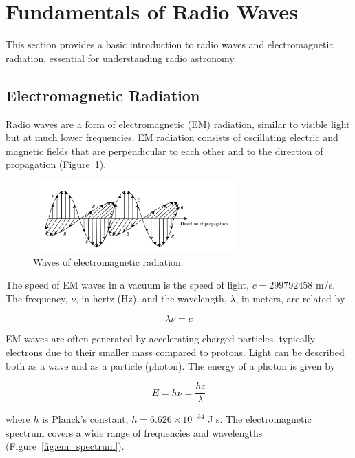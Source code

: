 \clearpage

\section{Fundamentals of Radio Waves}

This section provides a basic introduction to radio waves and electromagnetic radiation, essential for understanding radio astronomy.

\subsection{Electromagnetic Radiation}

Radio waves are a form of electromagnetic (EM) radiation, similar to visible light but at much lower frequencies. EM radiation consists of oscillating electric and magnetic fields that are perpendicular to each other and to the direction of propagation (Figure~\ref{fig:em_waves}).

\begin{figure}[H]
    \centering
    \includegraphics[width=0.7\textwidth]{Images/em_waves.png}
    \caption{Waves of electromagnetic radiation.}
    \label{fig:em_waves}
\end{figure}

The speed of EM waves in a vacuum is the speed of light, $c = 299 792 458$ m/s. The frequency, $\nu$, in hertz (Hz), and the wavelength, $\lambda$, in meters, are related by

\begin{equation}
    \lambda \nu = c
\end{equation}

EM waves are often generated by accelerating charged particles, typically electrons due to their smaller mass compared to protons. Light can be described both as a wave and as a particle (photon). The energy of a photon is given by

\begin{equation}
    E = h\nu = \frac{hc}{\lambda}
\end{equation}

where $h$ is Planck’s constant, $h = 6.626 \times 10^{-34}$ J s. The electromagnetic spectrum covers a wide range of frequencies and wavelengths (Figure~\ref{fig:em_spectrum}).

